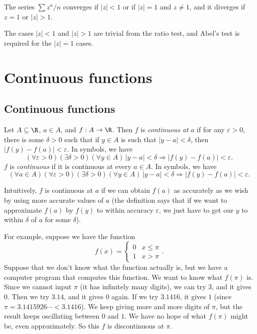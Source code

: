 \documentclass[a4paper]{article}
\begin{document}
\begin{eg}
  The series $\sum z^n/n$ converges if $|z| < 1$ or if $|z| = 1$ and $z \not= 1$, and it diverges if $z = 1$ or $|z| > 1$.

  The cases $|z| < 1$ and $|z| > 1$ are trivial from the ratio test, and Abel's test is required for the $|z| = 1$ cases.
\end{eg}
\section{Continuous functions}
\subsection{Continuous functions}
\begin{defi}
  Let $A\subseteq \R$, $a\in A$, and $f: A\to \R$. Then $f$ is \emph{continuous at} $a$ if for any $\varepsilon > 0 $, there is some $\delta > 0$ such that if $y \in A$ is such that $|y - a| < \delta$, then $|f(y) - f(a)| < \varepsilon$. In symbols, we have
  \[
    (\forall \varepsilon > 0)(\exists \delta > 0)(\forall y\in A)\, |y - a| < \delta \Rightarrow |f(y) - f(a)| < \varepsilon.
  \]
  $f$ is \emph{continuous} if it is continuous at every $a\in A$. In symbols, we have
  \[
    (\forall a\in A)(\forall \varepsilon > 0)(\exists \delta > 0)(\forall y\in A)\, |y - a| < \delta \Rightarrow |f(y) - f(a)| < \varepsilon.
  \]
\end{defi}
Intuitively, $f$ is continuous at $a$ if we can obtain $f(a)$ as accurately as we wish by using more accurate values of $a$ (the definition says that if we want to approximate $f(a)$ by $f(y)$ to within accuracy $\varepsilon$, we just have to get our $y$ to within $\delta$ of $a$ for some $\delta$).

For example, suppose we have the function
\[
  f(x) = \begin{cases} 0 & x \leq \pi\\ 1& x > \pi\end{cases}.
\]
Suppose that we don't know what the function actually is, but we have a computer program that computes this function. We want to know what $f(\pi)$ is. Since we cannot input $\pi$ (it has infinitely many digits), we can try $3$, and it gives $0$. Then we try $3.14$, and it gives $0$ again. If we try $3.1416$, it gives $1$ (since $\pi = 3.1415926\cdots < 3.1416$). We keep giving more and more digits of $\pi$, but the result keeps oscillating between $0$ and $1$. We have no hope of what $f(\pi)$ might be, even approximately. So this $f$ is discontinuous at $\pi$.
\end{document}
